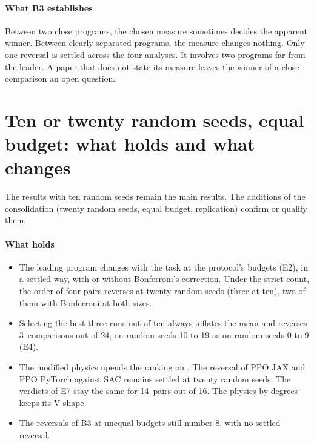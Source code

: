 \paragraph{What B3 establishes}
Between two close programs, the chosen measure sometimes decides the apparent winner. Between clearly
separated programs, the measure changes nothing. Only one reversal is settled across the four analyses.
It involves two programs far from the leader. A paper that does not state its measure leaves the winner of a
close comparison an open question.

\section{Ten or twenty random seeds, equal budget: what holds and what changes}\label{sec:consolidation}

The results with ten random seeds remain the main results. The additions of the consolidation (twenty random
seeds, equal budget, replication) confirm or qualify them.

\paragraph{What holds}
\begin{itemize}
  \item The leading program changes with the task at the protocol's budgets (E2), in a settled way, with or
    without Bonferroni's correction. Under the strict count, the order of four pairs reverses at twenty random
    seeds (three at ten), two of them with Bonferroni at both sizes.
  \item Selecting the best three runs out of ten always inflates the mean and reverses 3~comparisons out of
    24, on random seeds 10 to 19 as on random seeds 0 to 9 (E4).
  \item The modified physics upends the ranking on . The reversal of PPO JAX and PPO PyTorch
    against SAC remains settled at twenty random seeds. The verdicts of E7 stay the same for 14~pairs out of
    16. The physics by degrees keeps its V shape.
  \item The reversals of B3 at unequal budgets still number 8, with no settled reversal.
\end{itemize}

